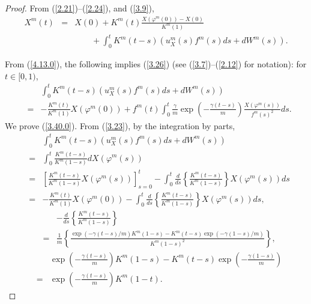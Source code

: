 \documentclass[10pt,a4paper]{amsart}
\begin{document}
\begin{proof}

From (\ref{2.21})--(\ref{2.24}), and (\ref{3.9}), 
\begin{eqnarray}
X^m(t)&=&X(0)+K^m(t)\frac{X(\varphi^m(0))-X(0)}{K^m(1)}\label{4.13.0}\\
&&\qquad +\int_{0}^{t} K^m(t-s)(u_X^m(s)f^m(s)ds +d W^m(s)).\nonumber
\end{eqnarray}

From (\ref{4.13.0}),
 the following implies (\ref{3.26}) (see (\ref{3.7})--(\ref{2.12})
for notation): for $t\in [0,1)$,
\begin{eqnarray}\label{3.40.0}
&&\int_{0}^{t} K^m(t-s)(u_X^m(s)f^m(s)ds +d W^m(s))\\
&=&-\frac{K^m(t)}{K^m(1)}X(\varphi^m(0))
+f^m(t)\int_{0}^{t}
\frac{\gamma}{m}\exp\left(-\frac{\gamma (t-s)}{m}\right)\frac{X(\varphi^m(s))}{f^m(s)^2}ds.\nonumber
 \end{eqnarray}
We prove (\ref{3.40.0}).  
 From (\ref{3.23}), by the integration by parts,
\begin{eqnarray}
&&\int_{0}^{t} K^m(t-s)(u_X^m(s)f^m(s)ds +d W^m(s))\label{4.15.0}\\
&=&\int_{0}^{t} \frac{K^m(t-s)}{K^m(1-s)}dX(\varphi^m(s))\nonumber\\
 &=&\left[\frac{K^m(t-s)}{K^m(1-s)}X(\varphi^m(s))\right]_{s=0}^t
 -\int_{0}^{t} \frac{d}{ds}\left\{\frac{K^m(t-s)}{K^m(1-s)}\right\}X(\varphi^m(s))ds\nonumber\\
 &=&-\frac{K^m(t)}{K^m(1)}X(\varphi^m(0))
 -\int_{0}^{t} \frac{d}{ds}\left\{\frac{K^m(t-s)}{K^m(1-s)}\right\}X(\varphi^m(s))ds,\nonumber
 \end{eqnarray}
 \begin{eqnarray}\label{3.39}
&& -\frac{d}{ds}\left\{\frac{K^m(t-s)}{K^m(1-s)}\right\}\\
&=&\frac{1}{m}\left\{\frac{\exp(-\gamma (t-s)/m)K^m(1-s)-K^m(t-s)\exp(-\gamma (1-s)/m)}{K^m(1-s)^2}\right\},\nonumber
\end{eqnarray}
\begin{eqnarray}\label{3.40}
&&\exp\left(-\frac{\gamma (t-s)}{m}\right)K^m(1-s)-K^m(t-s)\exp\left(-\frac{\gamma (1-s)}{m}\right)\\
&=&\exp\left(-\frac{\gamma (t-s)}{m}\right)K^m(1-t).\nonumber
\end{eqnarray}


\end{proof}
\end{document}
